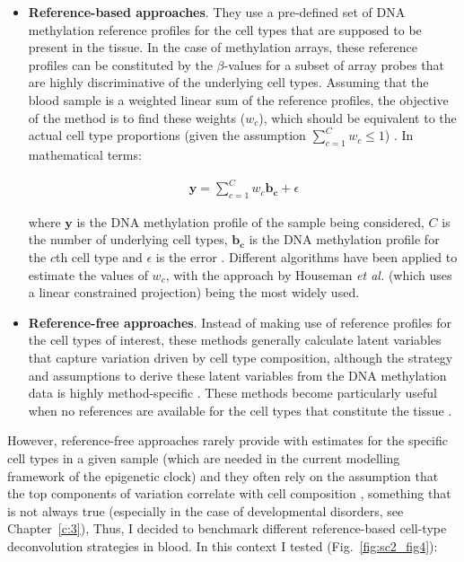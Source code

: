 \begin{itemize}
	
	\item \textbf{Reference-based approaches}. They use a pre-defined set of DNA methylation reference profiles for the cell types that are supposed to be present in the tissue. In the case of methylation arrays, these reference profiles can be constituted by the $\beta$-values for a subset of array probes that are highly discriminative of the underlying cell types. Assuming that the blood sample is a weighted linear sum of the reference profiles, the objective of the method is to find these weights ($w_c$), which should be equivalent to the actual cell type proportions (given the assumption $\sum_{c=1}^{C} w_c \leq 1$) \cite{Teschendorff2017}. In mathematical terms:
	
	\begin{align}
	\mathbf{y} = \sum_{c=1}^{C} w_c \mathbf{b_c} + \epsilon
	\end{align}
	
	where $\mathbf{y}$ is the DNA methylation profile of the sample being considered, $C$ is the number of underlying cell types, $\mathbf{b_c}$ is the DNA methylation profile for the $c$th cell type and $\epsilon$ is the error \cite{Teschendorff2017a}. Different algorithms have been applied to estimate the values of $w_c$, with the approach by Houseman \textit{et al.} (which uses a linear constrained projection) \cite{Houseman2012} being the most widely used. 
	
	\item \textbf{Reference-free approaches}. Instead of making use of reference profiles for the cell types of interest, these methods generally calculate latent variables that capture variation driven by cell type composition, although the strategy and assumptions to derive these latent variables from the DNA methylation data is highly method-specific \cite{Teschendorff2017}. These methods become particularly useful when no references are available for the cell types that constitute the tissue \cite{Teschendorff2017}.
	
\end{itemize} 

However, reference-free approaches rarely provide with estimates for the specific cell types in a given sample \cite{Teschendorff2017} (which are needed in the current modelling framework of the epigenetic clock) and they often rely on the assumption that the top components of variation correlate with cell composition \cite{Teschendorff2017a}, something that is not always true (especially in the case of developmental disorders, see Chapter~\ref{c:3}), Thus, I decided to benchmark different reference-based cell-type deconvolution strategies in blood. In this context I tested (Fig.~\ref{fig:sc2_fig4}):

